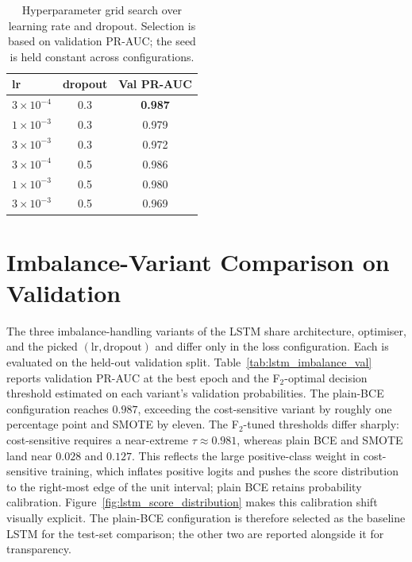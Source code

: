 \documentclass[oneside,12pt,parskip=half,american,numbers=noenddot]{scrreprt}
\begin{document}
\begin{table}[H]
\centering
\caption{Hyperparameter grid search over learning rate and dropout. Selection is based on validation PR-AUC; the seed is held constant across configurations.}
\label{tab:lstm_hpt}
\small
\renewcommand{\arraystretch}{1.2}
\begin{tabular}{lcc}
\hline
\textbf{lr} & \textbf{dropout} & \textbf{Val PR-AUC} \\
\hline
$3\times 10^{-4}$ & 0.3 & \textbf{0.987} \\
$1\times 10^{-3}$ & 0.3 & 0.979 \\
$3\times 10^{-3}$ & 0.3 & 0.972 \\
$3\times 10^{-4}$ & 0.5 & 0.986 \\
$1\times 10^{-3}$ & 0.5 & 0.980 \\
$3\times 10^{-3}$ & 0.5 & 0.969 \\
\hline
\end{tabular}
\end{table}

\section{Imbalance-Variant Comparison on Validation}
\label{subsec:val_imbalance}

The three imbalance-handling variants of the LSTM share architecture, optimiser, and the picked $(\text{lr}, \text{dropout})$ and differ only in the loss configuration. Each is evaluated on the held-out validation split. Table~\ref{tab:lstm_imbalance_val} reports validation PR-AUC at the best epoch and the F\(_2\)-optimal decision threshold estimated on each variant's validation probabilities. The plain-BCE configuration reaches $0.987$, exceeding the cost-sensitive variant by roughly one percentage point and SMOTE by eleven. The F\(_2\)-tuned thresholds differ sharply: cost-sensitive requires a near-extreme $\tau \approx 0.981$, whereas plain BCE and SMOTE land near $0.028$ and $0.127$. This reflects the large positive-class weight in cost-sensitive training, which inflates positive logits and pushes the score distribution to the right-most edge of the unit interval; plain BCE retains probability calibration. Figure~\ref{fig:lstm_score_distribution} makes this calibration shift visually explicit. The plain-BCE configuration is therefore selected as the baseline LSTM for the test-set comparison; the other two are reported alongside it for transparency.
\end{document}
